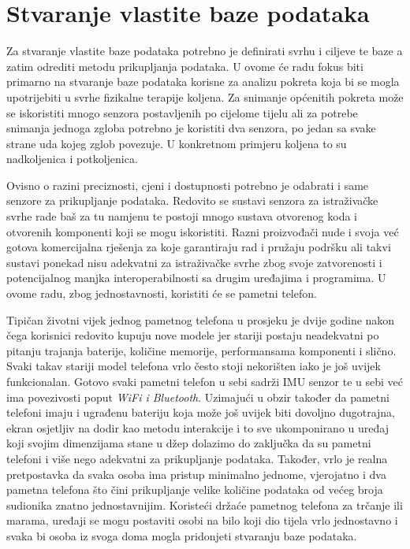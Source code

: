 \documentclass[times, utf8, diplomski]{fer}
\begin{document}
\section{Stvaranje vlastite baze podataka}
Za stvaranje vlastite baze podataka potrebno je definirati svrhu i ciljeve te baze a zatim odrediti metodu prikupljanja podataka. U ovome će radu
fokus biti primarno na stvaranje baze podataka korisne za analizu pokreta koja bi se mogla upotrijebiti u svrhe fizikalne terapije koljena.
Za snimanje općenitih pokreta može se iskoristiti mnogo senzora postavljenih po cijelome tijelu ali za potrebe snimanja jednoga zgloba potrebno je 
koristiti dva senzora, po jedan sa svake strane uda kojeg zglob povezuje. U konkretnom primjeru koljena to su nadkoljenica i potkoljenica.

Ovisno o razini preciznosti, cjeni i dostupnosti potrebno je odabrati i same senzore za prikupljanje podataka. Redovito se sustavi senzora
za istraživačke svrhe rade baš za tu namjenu te postoji mnogo sustava otvorenog koda i otvorenih komponenti koji se mogu iskoristiti. Razni
proizvođači nude i svoja već gotova komercijalna rješenja za koje garantiraju rad i pružaju podršku ali takvi sustavi ponekad nisu adekvatni za
istraživačke svrhe zbog svoje zatvorenosti i potencijalnog manjka interoperabilnosti sa drugim uređajima i programima. U ovome radu, zbog jednostavnosti,
koristiti će se pametni telefon.

Tipičan životni vijek jednog pametnog telefona u prosjeku je dvije godine nakon čega korisnici redovito kupuju nove modele jer stariji postaju neadekvatni
po pitanju trajanja baterije, količine memorije, performansama komponenti i slično. Svaki takav stariji model telefona vrlo često stoji nekorišten iako je još uvijek
funkcionalan. Gotovo svaki pametni telefon u sebi sadrži IMU senzor te u sebi već ima povezivosti poput \textit{WiFi i Bluetooth}. Uzimajući u obzir
također da pametni telefoni imaju i ugrađenu bateriju koja može još uvijek biti dovoljno dugotrajna, ekran osjetljiv na dodir kao metodu interakcije i to 
sve ukomponirano u uređaj koji svojim dimenzijama stane u džep dolazimo do zaključka da su pametni telefoni i više nego adekvatni za prikupljanje podataka.
Također, vrlo je realna pretpostavka da svaka osoba ima pristup minimalno jednome, vjerojatno i dva pametna telefona što čini prikupljanje velike količine
podataka od većeg broja sudionika znatno jednostavnijim. Koristeći držaće pametnog telefona za trčanje ili marama, uređaji se mogu postaviti osobi na bilo koji
dio tijela vrlo jednostavno i svaka bi osoba iz svoga doma mogla pridonjeti stvaranju baze podataka.
\end{document}
